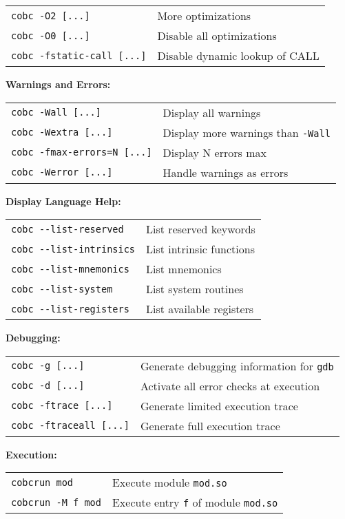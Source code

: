 \documentclass[10pt,landscape]{article}
\begin{document}
\begin{multicols}{3}
{\begin{tabular}{ll}
\verb+cobc -O2 [...]+ & More optimizations\\
\verb+cobc -O0 [...]+ & Disable all optimizations\\
\verb+cobc -fstatic-call [...]+ & Disable dynamic lookup of CALL\\
\end{tabular}
{\bf Warnings and Errors:}\\
\begin{tabular}{ll}
\verb+cobc -Wall [...]+ & Display all warnings\\
\verb+cobc -Wextra [...]+ & Display more warnings than \verb+-Wall+\\
\verb+cobc -fmax-errors=N [...]+ & Display N errors max\\
\verb+cobc -Werror [...]+ & Handle warnings as errors\\
\end{tabular}
{\bf Display Language Help:}\\
\begin{tabular}{ll}
\verb+cobc --list-reserved+ & List reserved keywords\\
\verb+cobc --list-intrinsics+ & List intrinsic functions\\
\verb+cobc --list-mnemonics+ & List mnemonics\\
\verb+cobc --list-system+ & List system routines\\
\verb+cobc --list-registers+ & List available registers\\
\end{tabular}
{\bf Debugging:}\\
\begin{tabular}{ll}
\verb+cobc -g [...]+ & Generate debugging information for \verb+gdb+\\
\verb+cobc -d [...]+ & Activate all error checks at execution\\
\verb+cobc -ftrace [...]+ & Generate limited execution trace\\
\verb+cobc -ftraceall [...]+ & Generate full execution trace\\
\end{tabular}
{\bf Execution:}\\
\begin{tabular}{ll}
\verb+cobcrun mod+ & Execute module \verb+mod.so+\\
\verb+cobcrun -M f mod+ & Execute entry \verb+f+ of module \verb+mod.so+\\
\end{tabular}
}


\end{multicols}
\end{document}
